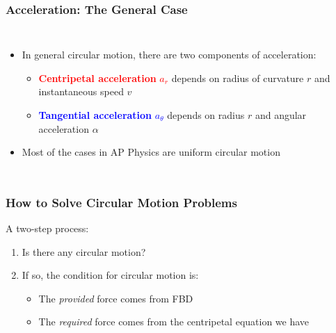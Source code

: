 \documentclass[12pt,compress,aspectratio=169]{beamer}
\newcommand{\mb}[1]{\ensuremath\mathbf{#1}}
\newcommand{\eq}[2]{\vspace{#1}{\Large\begin{displaymath}#2\end{displaymath}}}
\begin{document}
\begin{frame}
  \frametitle{Acceleration: The General Case}
  \begin{columns}
    
    \begin{itemize}
    \item In general circular motion, there are two components of acceleration:
      \begin{itemize}
      \item\textcolor{red}{\textbf{Centripetal acceleration} $a_r$} depends on
        radius of curvature $r$ and instantaneous speed $v$
      \item \textcolor{blue}{\textbf{Tangential acceleration} $a_\theta$}
        depends on radius $r$  and angular acceleration $\alpha$
      \end{itemize}
    \item Most of the cases in AP Physics are uniform circular motion
    \end{itemize}
  \end{columns}
\end{frame}


\begin{frame}
  \frametitle{How to Solve Circular Motion Problems}

  A two-step process:
  \begin{enumerate}
  \item Is there any circular motion?
  \item If so, the condition for circular motion is:

    \eq{-.2in}{
      \mb{F}_\mathrm{provided}=\mb{F}_\mathrm{required}
    }
    \begin{itemize}
    \item The \emph{provided} force comes from FBD
    \item The \emph{required} force comes from the centripetal equation we have
    \end{itemize}
  \end{enumerate}
\end{frame}
\end{document}
